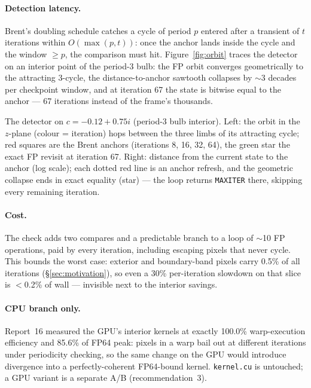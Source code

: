 \documentclass[
	english,
	letterpaper, oneside
]{article}
\begin{document}
\paragraph{Detection latency.} Brent's doubling schedule catches a cycle of
period $p$ entered after a transient of $t$ iterations within $O(\max(p, t))$:
once the anchor lands inside the cycle and the window $\ge p$, the comparison
must hit. Figure~\ref{fig:orbit} traces the detector on an interior point of
the period-3 bulb: the FP orbit converges geometrically to the attracting
3-cycle, the distance-to-anchor sawtooth collapses by $\sim$3 decades per
checkpoint window, and at iteration 67 the state is bitwise equal to
the anchor --- 67 iterations instead of the frame's thousands.

            {The detector on $c = -0.12+0.75i$ (period-3 bulb interior).
             Left: the orbit in the $z$-plane (colour = iteration) hops
             between the three limbs of its attracting cycle; red squares are
             the Brent anchors (iterations 8, 16, 32, 64), the green star the
             exact FP revisit at iteration 67. Right: distance from the
             current state to the anchor (log scale); each dotted red line is
             an anchor refresh, and the geometric collapse ends in exact
             equality (star) --- the loop returns \texttt{MAXITER} there,
             skipping every remaining iteration. \label{fig:orbit}}

\paragraph{Cost.} The check adds two compares and a predictable branch to a
loop of $\sim$10 FP operations, paid by every iteration, including
escaping pixels that never cycle. This bounds the worst case: exterior and
boundary-band pixels carry 0.5\% of all iterations
(\S\ref{sec:motivation}), so even a 30\% per-iteration slowdown on that slice
is $<$0.2\% of wall --- invisible next to the interior savings.

\paragraph{CPU branch only.} Report~16 measured the GPU's interior kernels at
exactly 100.0\% warp-execution efficiency and 85.6\% of FP64 peak: pixels in
a warp bail out at different iterations under periodicity checking, so
the same change on the GPU would introduce divergence into a
perfectly-coherent FP64-bound kernel. \texttt{kernel.cu} is untouched; a GPU
variant is a separate A/B (recommendation~3).
\end{document}
